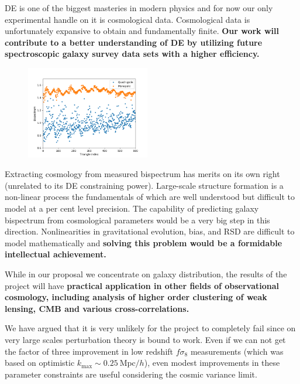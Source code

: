 DE is one of the biggest masteries in modern physics and for now our only
experimental handle on it is cosmological data. Cosmological data is
unfortunately expansive to obtain and fundamentally finite. \textbf{Our work
will contribute to a better understanding of DE by utilizing future
spectroscopic galaxy survey data sets with a higher efficiency.} 

\begin{figure}
\begin{center}
\includegraphics[width=0.48\textwidth]{MonQuad.png}
\end{center}
\end{figure}


Extracting cosmology from measured bispectrum has merits on its own right
(unrelated to its DE constraining power). Large-scale structure formation is a
non-linear process the fundamentals of which are well understood but difficult
to model at a per cent level precision. The capability of predicting galaxy
bispectrum from cosmological parameters would be a very big step in this
direction. Nonlinearities in gravitational evolution, bias, and RSD are
difficult to model mathematically and \textbf{solving this problem would be a
formidable intellectual achievement.}

While in our proposal we concentrate on galaxy distribution, the results of the
project will have \textbf{practical application in other fields of observational
cosmology, including analysis of higher order clustering of weak lensing, CMB
and various cross-correlations.}


We have argued that it is very unlikely for the project to completely fail
since on very large scales perturbation theory is bound to work. Even if we can
not get the factor of three improvement in low redshift $f\sigma_8$
measurements (which was based on optimistic $k_\mathrm{max}\sim 0.25\
\mathrm{Mpc}/h$), even modest improvements in these parameter constraints
are useful considering the cosmic variance limit. 

